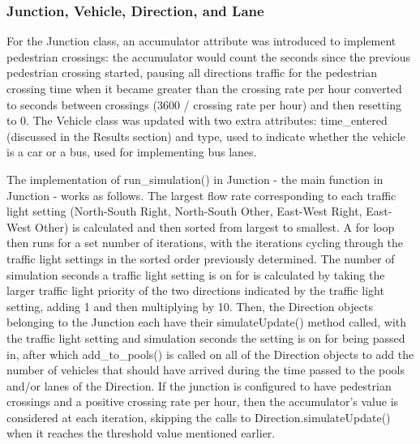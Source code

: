 \documentclass{article}
\begin{document}
    \subsubsection{Junction, Vehicle, Direction, and Lane}
    For the Junction class, an accumulator attribute was introduced to implement pedestrian crossings: the accumulator would
    count the seconds since the previous pedestrian crossing started, pausing all directions traffic for the pedestrian crossing
    time when it became greater than the crossing rate per hour converted to seconds between crossings (3600 / crossing rate per hour)
    and then resetting to 0. The Vehicle class was updated with two extra attributes: time\_entered (discussed in the Results section) and
    type, used to indicate whether the vehicle is a car or a bus, used for implementing bus lanes.

    The implementation of run_simulation() in Junction - the main function in Junction - works as follows. The largest flow rate corresponding 
    to each traffic light setting (North-South Right, North-South Other, East-West Right, East-West Other) is calculated and then sorted from 
    largest to smallest. A for loop then runs for a set number of iterations, with the iterations cycling through the traffic light settings 
    in the sorted order previously determined. The number of simulation seconds a traffic light setting is on for is calculated by taking the 
    larger traffic light priority of the two directions indicated by the traffic light setting, adding 1 and then multiplying by 10. Then, the 
    Direction objects belonging to the Junction each have their simulateUpdate() method called, with the traffic light setting and simulation 
    seconds the setting is on for being passed in, after which add_to_pools() is called on all of the Direction objects to add the number of 
    vehicles that should have arrived during the time passed to the pools and/or lanes of the Direction. If the junction is configured to have 
    pedestrian crossings and a positive crossing rate per hour, then the accumulator’s value is considered at each iteration, skipping the calls 
    to Direction.simulateUpdate() when it reaches the threshold value mentioned earlier.
\end{document}
